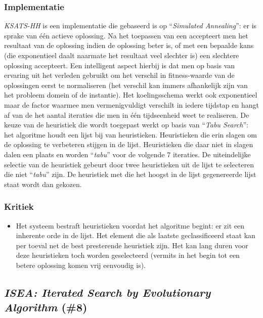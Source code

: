 \subsubsection{Implementatie}
\emph{KSATS-HH}\cite{chesc-ksats-hh} is een implementatie die gebaseerd is op ``\emph{Simulated Annealing}''\cite{citeulike:1612433}: er is sprake van \'e\'en actieve oplossing. Na het toepassen van een \abllh{} accepteert men het resultaat van de oplossing indien de oplossing beter is, of met een bepaalde kans (die exponentieel daalt naarmate het resultaat veel slechter is) een slechtere oplossing accepteert. Een intelligent aspect hierbij is dat men op basis van ervaring uit het verleden gebruikt om het verschil in fitness-waarde van de oplossingen eerst te normaliseren (het verschil kan immers afhankelijk zijn van het probleem domein of de instantie). Het koelingsschema werkt ook exponentieel maar de factor waarmee men vermenigvuldigt verschilt in iedere tijdstap en hangt af van de het aantal iteraties die men in \'e\'en tijdseenheid weet te realiseren. De keuze van de heuristiek die wordt toegepast werkt op basis van ``\emph{Tabu Search}''\cite{DBLP:journals/informs/Glover89}: het algoritme houdt een lijst bij van heuristieken. Heuristieken die erin slagen om de oplossing te verbeteren stijgen in de lijst. Heuristieken die daar niet in slagen dalen een plaats en worden ``\emph{tabu}'' voor de volgende 7 iteraties. De uiteindelijke selectie van de heuristiek gebeurt door twee heuristieken uit de lijst te selecteren die niet ``\emph{tabu}'' zijn. De heuristiek met die het hoogst in de lijst gegenereerde lijst staat wordt dan gekozen.
\subsubsection{Kritiek}
\begin{itemize}
 \item Het systeem bestraft heuristieken voordat het algoritme begint: er zit een inherente orde in de lijst. Het element die als laatste geclassificeerd staat kan per toeval net de best presterende heuristiek zijn. Het kan lang duren voor deze heuristieken toch worden geselecteerd (vermits in het begin tot een betere oplossing komen vrij eenvoudig is).
\end{itemize}
\subsection{\emph{ISEA: Iterated Search by Evolutionary Algorithm} (\#8)}
\label{sss:isea}
